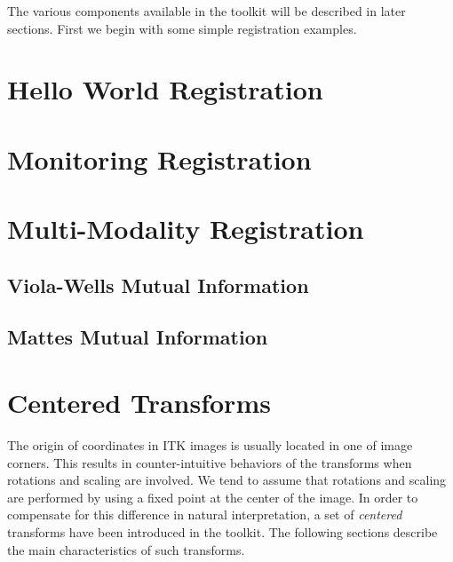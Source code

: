 The various components available in the toolkit will be described in later sections.
First we begin with some simple registration examples.

\section{Hello World Registration}
\label{sec:IntroductionImageRegistration}
\ifitkFullVersion

\fi

\section{Monitoring Registration}
\label{sec:MonitoringImageRegistration}
\ifitkFullVersion

\fi



\section{Multi-Modality Registration}
\label{sec:MultiModalityRegistration}

\subsection{Viola-Wells Mutual Information}
\label{sec:MultiModalityRegistrationViolaWells}
\ifitkFullVersion

\fi

\subsection{Mattes Mutual Information}
\label{sec:MultiModalityRegistrationMattes}
\ifitkFullVersion

\fi


\section{ Centered Transforms }

The origin of coordinates in ITK images is usually located in one of image
corners. This results in counter-intuitive behaviors of the transforms when
rotations and scaling are involved. We tend to assume that rotations and
scaling are performed by using a fixed point at the center of the image.  In
order to compensate for this difference in natural interpretation, a set of
\emph{centered} transforms have been introduced in the toolkit. The following
sections describe the main characteristics of such transforms.

